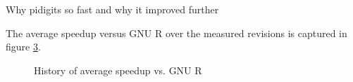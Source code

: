 \begin{figure}[htbp]
  \caption{\label{fig:}\todo}
  \centering
\end{figure}

\begin{figure}[htbp]
  \caption{\label{fig:}\todo}
  \centering
\end{figure}

Why pidigits so fast and why it improved further

The average speedup versus GNU R over the measured revisions is captured in figure \ref{fig:avg-speedup-history}.

\begin{figure}[htbp]
  \caption{\label{fig:avg-speedup-history}History of average speedup vs. GNU R}
  \centering
\end{figure}

